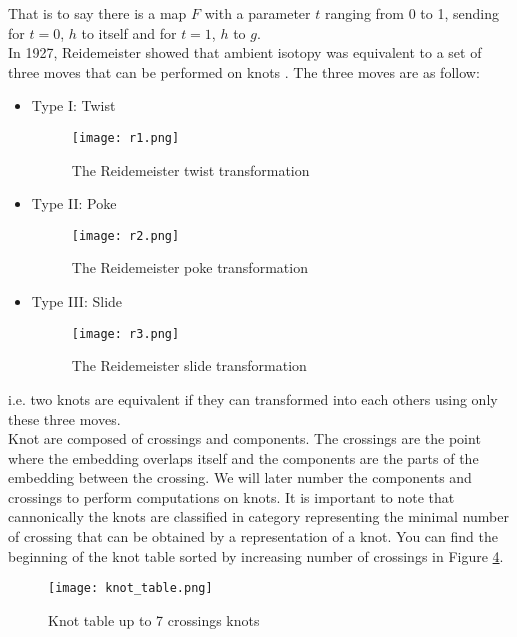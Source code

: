 \documentclass[12pt, a4paper]{article}
\begin{document}
That is to say there is a map $F$ with a parameter $t$ ranging from 0 to 1, sending for $t=0$, $h$ to itself and for $t = 1$, $h$ to $g$.\\

In 1927, Reidemeister showed that ambient isotopy was equivalent to a set of three moves that can be performed on knots \cite{reidemeister_elementare_1927}. The three moves are as follow:

\begin{itemize}
    \item Type I: Twist
\begin{figure}[H]
             \centering
            \texttt{[image: r1.png]}
            \caption{The Reidemeister twist transformation}
        \label{fig:r_1}
\end{figure}
    \item Type II: Poke
\begin{figure}[H]
             \centering
            \texttt{[image: r2.png]}
            \caption{The Reidemeister poke transformation}
        \label{fig:r_2}
\end{figure}
    \item Type III: Slide 
\begin{figure}[H]
             \centering
            \texttt{[image: r3.png]}
            \caption{The Reidemeister slide transformation}
        \label{fig:r_3}
\end{figure}
  \end{itemize}

i.e. two knots are equivalent if they can transformed into each others using only these three moves.\\

Knot are composed of crossings and components. The crossings are the point where the embedding overlaps itself and the components are the parts of the embedding between the crossing. We will later number the components and crossings to perform computations on knots. It is important to note that cannonically the knots are classified in category representing the minimal number of crossing that can be obtained by a representation of a knot. You can find the beginning of the knot table sorted by increasing number of crossings in Figure \ref{fig:knot_table}.

\begin{figure}[H]
  \centering
  \texttt{[image: knot\_table.png]}
  \caption{Knot table up to 7 crossings knots}
  \label{fig:knot_table}
\end{figure}
\end{document}
